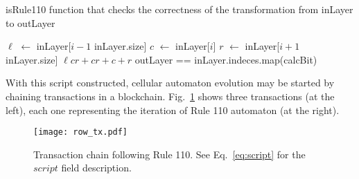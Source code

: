 \documentclass[runningheads]{llncs}
\newcommand{\dnote}[1]{\textcolor{red}{D: {#1}}}
\newcommand{\vk}[1]{\textcolor{blue}{V: {#1}}}
\newcommand{\payload}{\textit{payload}}
\newcommand{\script}{\textit{script}}
\def\Let#1#2{\State #1 $\gets$ #2}
\begin{document}
    \begin{algorithm}[H]
        \caption{isRule110 function that checks the correctness of the transformation from
        inLayer to outLayer}
        \label{alg:isRule110}
        \begin{algorithmic}[1]
            \Let{$\ell$}{inLayer[$i-1$ \Mod inLayer.size]}
            \Let{$c$}{inLayer[$i$]}
            \Let{$r$}{inLayer[$i+1$ \Mod inLayer.size]}
            \State
            \Return $\ell c r + cr + c + r$ 
            \EndFunction
            \State \Return outLayer == inLayer.indeces.map(calcBit)
            \EndFunction
            \vskip8pt
        \end{algorithmic}
    \end{algorithm}

    With this script constructed, cellular automaton evolution may be started by
    chaining transactions in a blockchain. Fig.~\ref{fig:txs} shows three
    transactions (at the left), each one representing the iteration of Rule 110
    automaton (at the right).

    \begin{figure}[h]
        \centering
        \texttt{[image: row\_tx.pdf]}
        \caption{Transaction chain following Rule 110. See Eq.~\ref{eq:script} for the
            $script$ field description.
        \label{fig:txs} }
    \end{figure}
\end{document}
